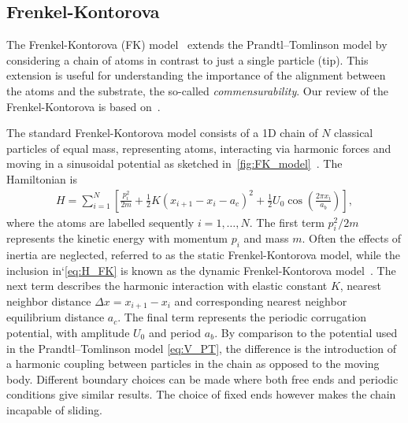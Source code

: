 



\subsection{Frenkel-Kontorova}
The Frenkel-Kontorova (\acrshort{FK}) model~\cite{Frenkel_1938} extends the Prandtl–Tomlinson model by considering a chain of atoms in contrast to just a single particle (tip). This extension is useful for understanding the importance of the alignment between the atoms and the substrate, the so-called \textit{commensurability}. Our review of the Frenkel-Kontorova is based on~\cite{Manini_2016, Vanossi_2013}.

The standard Frenkel-Kontorova model consists of a 1D chain of $N$ classical particles of equal mass, representing atoms, interacting via harmonic forces and moving in a sinusoidal potential as sketched in~\cref{fig:FK_model}~\cite{Manini_2016}. The Hamiltonian is 
\begin{align}
  H = \sum_{i=1}^N \left[\frac{p_i^2}{2m} + \frac{1}{2}K(x_{i+1} - x_i - a_c)^2 + \frac{1}{2}U_0 \cos{\left(\frac{2\pi x_i}{a_b}\right)}\right],
  \label{eq:H_FK}
\end{align}
where the atoms are labelled sequently $i = 1, \hdots, N$. The first term $p_i^2/2m$ represents the kinetic energy with momentum $p_i$
and mass $m$. Often the effects of inertia are neglected, referred to as the static Frenkel-Kontorova model, while the inclusion in‘\cref{eq:H_FK} is known as the dynamic Frenkel-Kontorova model~\cite{FK2D}. The next term describes the harmonic interaction with elastic
constant $K$, nearest neighbor distance $\Delta x = x_{i+1} - x_i$ and 
corresponding nearest neighbor equilibrium distance $a_c$. The final term represents the periodic corrugation potential, with amplitude $U_0$ and period $a_b$. By comparison to the potential used in the Prandtl–Tomlinson model \cref{eq:V_PT}, the difference is the introduction of a harmonic coupling between particles in the chain as opposed to the moving body. Different boundary choices can be made where both free ends and periodic conditions give similar results. The choice of fixed ends however makes the chain incapable of sliding.

